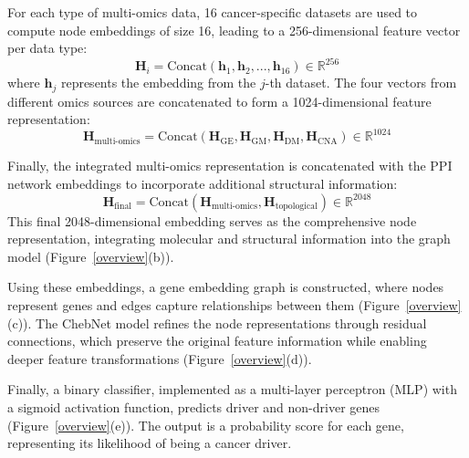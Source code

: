 	For each type of multi-omics data, 16 cancer-specific datasets are used to compute node embeddings of size 16, leading to a 256-dimensional feature vector per data type:
	\begin{equation}
		\mathbf{H}_i = \text{Concat}(\mathbf{h}_1, \mathbf{h}_2, ..., \mathbf{h}_{16}) \in \mathbb{R}^{256}
	\end{equation}
	where \( \mathbf{h}_j \) represents the embedding from the \( j \)-th dataset. The four vectors from different omics sources are concatenated to form a 1024-dimensional feature representation:
	\begin{equation}
		\mathbf{H}_{\text{multi-omics}} = \text{Concat}(\mathbf{H}_{\text{GE}}, \mathbf{H}_{\text{GM}}, \mathbf{H}_{\text{DM}}, \mathbf{H}_{\text{CNA}}) \in \mathbb{R}^{1024}
	\end{equation}
	
	Finally, the integrated multi-omics representation is concatenated with the PPI network embeddings to incorporate additional structural information:
	\begin{equation}
		\mathbf{H}_{\text{final}} = \text{Concat}(\mathbf{H}_{\text{multi-omics}}, \mathbf{H}_{\text{topological}}) \in \mathbb{R}^{2048}
	\end{equation}
	This final 2048-dimensional embedding serves as the comprehensive node representation, integrating molecular and structural information into the graph model (Figure~\ref{overview}(b)).
	
	Using these embeddings, a gene embedding graph is constructed, where nodes represent genes and edges capture relationships between them (Figure~\ref{overview}(c)). The ChebNet model refines the node representations through residual connections, which preserve the original feature information while enabling deeper feature transformations (Figure~\ref{overview}(d)).
	
	Finally, a binary classifier, implemented as a multi-layer perceptron (MLP) with a sigmoid activation function, predicts driver and non-driver genes (Figure~\ref{overview}(e)). The output is a probability score for each gene, representing its likelihood of being a cancer driver.
	

